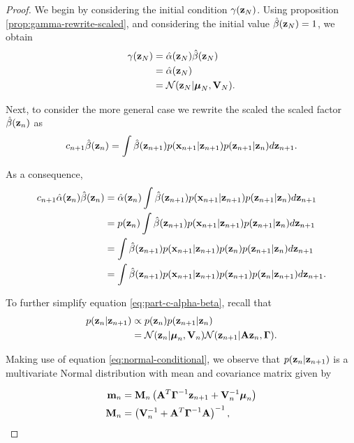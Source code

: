 \documentclass[11pt]{article}
\numberwithin{equation}{section}
\newcommand{\x}{{\bf x}}
\newcommand{\z}{{\bf z}}
\newcommand{\N}{\mathcal{N}}
\begin{document}
\begin{proof}
	We begin by considering the initial condition $\gamma(\z_N)$. Using proposition \ref{prop:gamma-rewrite-scaled}, and considering the initial value $\hat\beta(\z_N)=1$, we obtain
	\begin{align}
		\gamma(\z_N) &= \hat\alpha(\z_N)\hat\beta(\z_N)\\
					 &= \hat\alpha(\z_N)\\
					 &= \N(\z_N \vert \boldsymbol\mu_N, {\bf V}_N).
	\end{align}

	Next, to consider the more general case we rewrite the scaled the scaled factor $\hat\beta(\z_n)$ as
	\begin{equation}
		c_{n+1} \hat\beta(\z_n) = \int \hat\beta(\z_{n+1}) p(\x_{n+1} \vert \z_{n+1}) p(\z_{n+1} \vert \z_n) d\z_{n+1}.
	\end{equation}
	
	As a consequence,	
	\begin{align}
		c_{n+1}\hat\alpha(\z_n)\hat\beta(\z_n) &= \hat\alpha(\z_n) \int \hat\beta(\z_{n+1}) p(\x_{n+1} \vert \z_{n+1}) p(\z_{n+1} \vert \z_n) d\z_{n+1}\\
		&= p(\z_n)\int \hat\beta(\z_{n+1}) p(\x_{n+1}\vert \z_{n+1})p(\z_{n+1}\vert \z_n) d\z_{n+1}\\
		&= \int \hat\beta(\z_{n+1}) p(\x_{n+1}\vert \z_{n+1}) p(\z_n) p(\z_{n+1}\vert \z_n) d\z_{n+1}\\
		&= \int \hat\beta(\z_{n+1 }) p(\x_{n+1}\vert \z_{n+1}) p(\z_{n+1}) p(\z_{n}\vert \z_{n+1}) d\z_{n+1} \label{eq:part-c-alpha-beta}.
	\end{align}
	
	To further simplify equation \eqref{eq:part-c-alpha-beta}, recall that
	\begin{align}
		p(\z_n\vert \z_{n+1}) &\propto p(\z_n) p(\z_{n+1} \vert \z_n) \\
		&= \N(\z_n \vert\boldsymbol\mu_n, {\bf V}_n) \N(\z_{n+1} \vert {\bf A}\z_n, \boldsymbol\Gamma).
	\end{align}
	
	Making use of equation \eqref{eq:normal-conditional}, we observe that $p(\z_n \vert \z_{n+1})$ is a multivariate Normal distribution with mean and covariance matrix given by
	
	\begin{align}
		{\bf m}_n &= {\bf M}_n \left({\bf A}^T\boldsymbol\Gamma^{-1}\z_{n+1} + {\bf V}_n^{-1}\boldsymbol\mu_n\right)\\
		{\bf M}_n &= \left( {\bf V}_n^{-1}  + {\bf A}^T\boldsymbol{\Gamma}^{-1}{\bf A} \right)^{-1},
	\end{align}
	

\end{proof}
\end{document}
